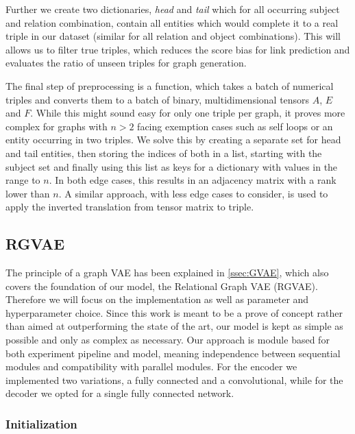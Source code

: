 Further we create two dictionaries, \textit{head} and \textit{tail} which for all occurring subject and relation combination, contain all entities which would complete it to a real triple in our dataset (similar for all relation and object combinations). This will allows us to filter true triples, which reduces the score bias for link prediction and evaluates the ratio of unseen triples for graph generation. 

The final step of preprocessing is a function, which takes a batch of numerical triples and converts them to a batch of binary, multidimensional tensors $A$, $E$ and $F$. While this might sound easy for only one triple per graph, it proves more complex for graphs with $n>2$ facing exemption cases such as self loops or an entity occurring in two triples. We solve this by creating a separate set for head and tail entities, then storing the indices of both in a list, starting with the subject set and finally using this list as keys for a dictionary with values in the range to $n$. In both edge cases, this results in an adjacency matrix with a rank lower than $n$. A similar approach, with less edge cases to consider, is used to apply the inverted translation from tensor matrix to triple.


\subsection{RGVAE}
The principle of a graph VAE has been explained in \ref{ssec:GVAE}, which also covers the foundation of our model, the Relational Graph VAE (RGVAE). Therefore we will focus on the implementation as well as parameter and hyperparameter choice. Since this work is meant to be a prove of concept rather than aimed at outperforming the state of the art, our model is kept as simple as possible and only as complex as necessary. Our approach is module based for both experiment pipeline and model, meaning independence between sequential modules and compatibility with parallel modules. For the encoder we implemented two variations, a fully connected and a convolutional, while for the decoder we opted for a single fully connected network.

\subsubsection{Initialization}

